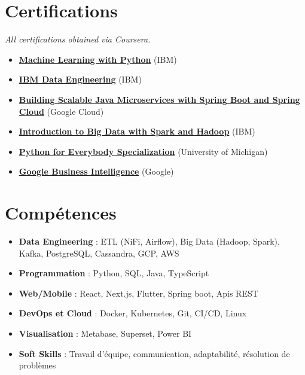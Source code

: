 \documentclass[10pt,a4paper,sans]{moderncv}
\begin{document}
\section{\fontsize{11.2}{13}\selectfont Certifications}
\vspace{-5pt}
    \textit{All certifications obtained via Coursera.}
\begin{itemize}[leftmargin=0.3cm, itemsep=-2pt, topsep=0pt, partopsep=0pt, parsep=0pt]
    \item \textbf{\href{https://www.coursera.org/account/accomplishments/verify/G178XXP17WQA}{Machine Learning with Python}} (IBM)
    \item \textbf{\href{https://www.coursera.org/account/accomplishments/records/M5RKGX36BAVA}{IBM Data Engineering}} (IBM)
    \item \textbf{\href{https://google.com}{Building Scalable Java Microservices with Spring Boot and Spring Cloud}} (Google Cloud)
    \item \textbf{\href{https://www.coursera.org/account/accomplishments/verify/EK5SJM3YM7PX}{Introduction to Big Data with Spark and Hadoop}} (IBM)
    \item \textbf{\href{https://www.coursera.org/account/accomplishments/specialization/B4RCUAYCUG49}{Python for Everybody Specialization}} (University of Michigan)
    \item \textbf{\href{https://www.coursera.org/account/accomplishments/records/G867SJLRFQS2}{Google Business Intelligence}} (Google)
\end{itemize}


\vspace{-17pt}
\section{\fontsize{11.2}{13}\selectfont Compétences}
\vspace{-6pt}
\begin{itemize}[leftmargin=0.3cm, itemsep=-2pt, topsep=0pt, partopsep=0pt, parsep=0pt]
    \item \textbf{Data Engineering} : ETL (NiFi, Airflow), Big Data (Hadoop, Spark), Kafka, PostgreSQL, Cassandra, GCP, AWS
    \item \textbf{Programmation} : Python, SQL, Java, TypeScript
    \item \textbf{Web/Mobile} : React, Next.js, Flutter, Spring boot, Apis REST
    \item \textbf{DevOps et Cloud} : Docker, Kubernetes, Git, CI/CD, Linux
    \item \textbf{Visualisation} : Metabase, Superset, Power BI
    \item \textbf{Soft Skills} : Travail d’équipe, communication, adaptabilité, résolution de problèmes
\end{itemize}
\end{document}
